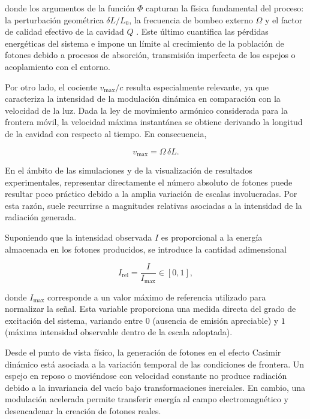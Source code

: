 \documentclass[11pt,a4paper]{article}
\begin{document}
donde los argumentos de la función $\Phi$ capturan la física fundamental del proceso: la perturbación geométrica $\delta L/L_0$, la frecuencia de bombeo externo $\Omega$ y el factor de calidad efectivo de la cavidad $Q$ \cite{dodonov2020}. Este último cuantifica las pérdidas energéticas del sistema e impone un límite al crecimiento de la población de fotones debido a procesos de absorción, transmisión imperfecta de los espejos o acoplamiento con el entorno.

Por otro lado, el cociente $v_{\max}/c$ resulta especialmente relevante, ya que caracteriza la intensidad de la modulación dinámica en comparación con la velocidad de la luz. Dada la ley de movimiento armónico considerada para la frontera móvil, la velocidad máxima instantánea se obtiene derivando la longitud de la cavidad con respecto al tiempo. En consecuencia,

\begin{equation}
v_{\max}=\Omega\,\delta L.
\end{equation}

En el ámbito de las simulaciones y de la visualización de resultados experimentales, representar directamente el número absoluto de fotones puede resultar poco práctico debido a la amplia variación de escalas involucradas. Por esta razón, suele recurrirse a magnitudes relativas asociadas a la intensidad de la radiación generada.

Suponiendo que la intensidad observada $I$ es proporcional a la energía almacenada en los fotones producidos, se introduce la cantidad adimensional

\begin{equation}
I_{\mathrm{rel}}
=
\frac{I}{I_{\max}}
\in [0,1],
\end{equation}

donde $I_{\max}$ corresponde a un valor máximo de referencia utilizado para normalizar la señal. Esta variable proporciona una medida directa del grado de excitación del sistema, variando entre $0$ (ausencia de emisión apreciable) y $1$ (máxima intensidad observable dentro de la escala adoptada).

Desde el punto de vista físico, la generación de fotones en el efecto Casimir dinámico está asociada a la variación temporal de las condiciones de frontera. Un espejo en reposo o moviéndose con velocidad constante no produce radiación debido a la invariancia del vacío bajo transformaciones inerciales. En cambio, una modulación acelerada permite transferir energía al campo electromagnético y desencadenar la creación de fotones reales.
\end{document}
